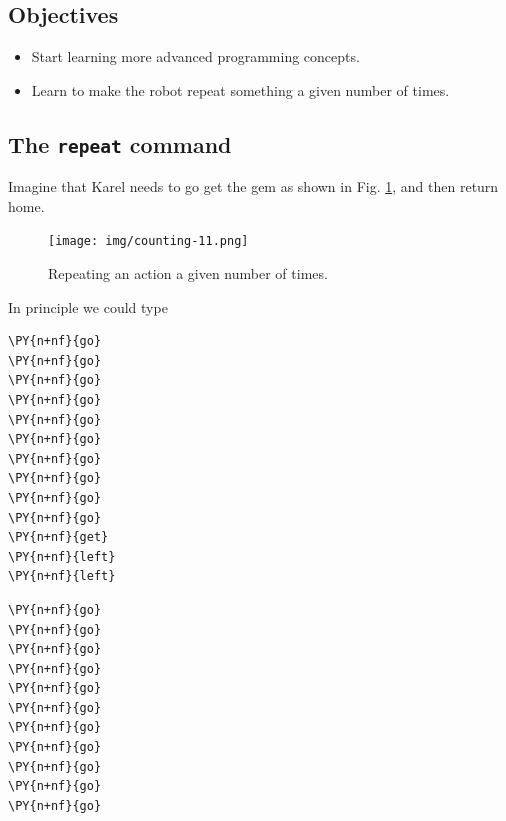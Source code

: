 \subsection{Objectives} 

\begin{itemize}
\item Start learning more advanced programming concepts.
\item Learn to make the robot repeat something a given number of times.
\end{itemize}

\subsection{The {\tt repeat} command}

Imagine that Karel needs to go get the gem as shown in 
Fig. \ref{fig:counting-11}, and then return home. 

\begin{figure}[!ht]
\begin{center}
\texttt{[image: img/counting-11.png]}
\vspace{-0mm}
\caption{Repeating an action a given number of times.}
\label{fig:counting-11}
\end{center}
\end{figure}

\noindent
In principle we could type\\

\begin{bbox}
\begin{Verbatim}[commandchars=\\\{\}]
\PY{n+nf}{go}
\PY{n+nf}{go}
\PY{n+nf}{go}
\PY{n+nf}{go}
\PY{n+nf}{go}
\PY{n+nf}{go}
\PY{n+nf}{go}
\PY{n+nf}{go}
\PY{n+nf}{go}
\PY{n+nf}{go}
\PY{n+nf}{get}
\PY{n+nf}{left}
\PY{n+nf}{left}
\end{Verbatim}
\end{bbox}
\vspace{6mm}


\begin{bbox}
\begin{Verbatim}[commandchars=\\\{\}]
\PY{n+nf}{go}
\PY{n+nf}{go}
\PY{n+nf}{go}
\PY{n+nf}{go}
\PY{n+nf}{go}
\PY{n+nf}{go}
\PY{n+nf}{go}
\PY{n+nf}{go}
\PY{n+nf}{go}
\PY{n+nf}{go}
\PY{n+nf}{go}
\end{Verbatim}
\end{bbox}
\vspace{6mm}

